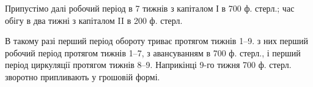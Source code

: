 Припустімо далі робочий період в 7 тижнів з капіталом І в 700 ф.
стерл.; час обігу в два тижні з капіталом II в 200 ф. стерл.

В такому разі перший період обороту триває протягом тижнів 1--9.
з них перший робочий період протягом тижнів 1--7, з авансуванням
в 700 ф. стерл., і перший період циркуляції протягом тижнів 8--9. Наприкінці
9-го тижня 700 ф. стерл. зворотно припливають у грошовій формі.
